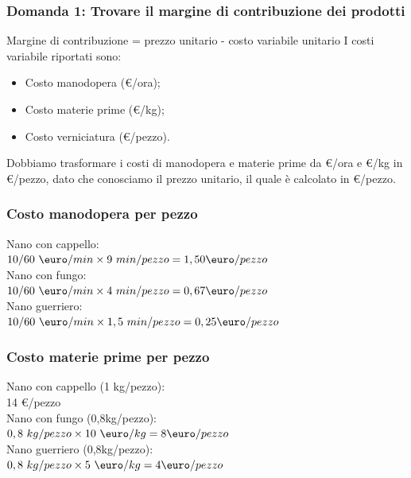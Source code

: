 \documentclass{article}
\begin{document}
\subsubsection*{Domanda 1: Trovare il margine di contribuzione dei prodotti}
Margine di contribuzione = prezzo unitario - costo variabile unitario
I costi variabile riportati sono:
\begin{itemize}
    \item Costo manodopera (€/ora);
    \item Costo materie prime (€/kg);
    \item Costo verniciatura (€/pezzo).
\end{itemize}
Dobbiamo trasformare i costi di manodopera e materie prime da €/ora e €/kg in €/pezzo, dato che conosciamo il prezzo unitario, il quale è calcolato in €/pezzo.

\subsubsection*{Costo manodopera per pezzo}
Nano con cappello:\\
$10/60 \  \T{\euro} / min \times 9\  min/pezzo = 1,50 \T{\euro}/pezzo $
\vspace*{0.2cm}\\
Nano con fungo:\\
$10/60 \ \T{\euro} / min \times 4\ min/pezzo = 0,67 \T{\euro}/pezzo $
\vspace*{0.2cm}\\
Nano guerriero:\\
$10/60 \ \T{\euro} / min \times 1,5\ min/pezzo = 0,25 \T{\euro}/pezzo $

\subsubsection*{Costo materie prime per pezzo}
Nano con cappello (1 kg/pezzo):\\
14 €/pezzo
\vspace*{0.1cm}\\
Nano con fungo (0,8kg/pezzo):\\
$ 0,8\ kg/pezzo \times 10\ \T{\euro}/kg = 8 \T{\euro}/pezzo $
\vspace*{0.1cm}\\
Nano guerriero (0,8kg/pezzo):\\
$ 0,8\ kg/pezzo \times 5\ \T{\euro}/kg = 4 \T{\euro}/pezzo $
\end{document}
